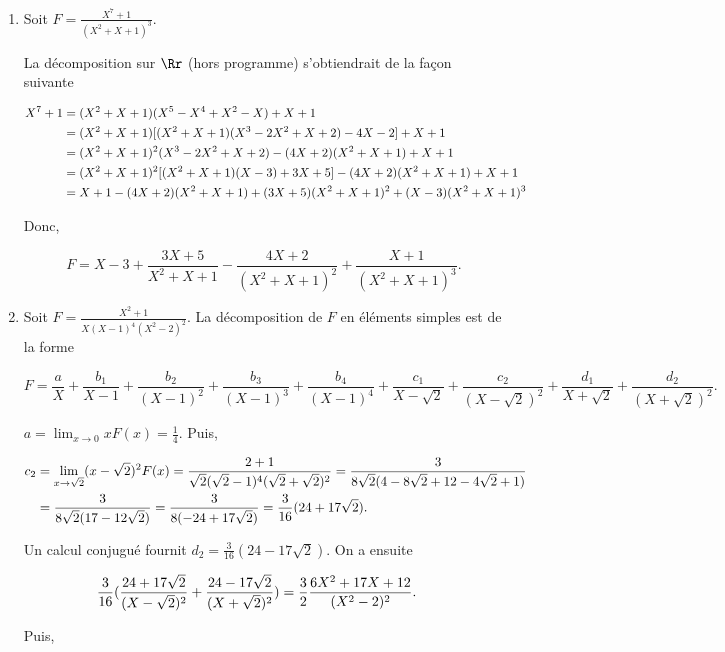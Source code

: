 {{\begin{enumerate}
$$F=X+1+\frac{2}{3}\frac{1}{X-1}-\frac{1}{3}\frac{1}{X-j}-\frac{1}{3}\frac{1}{X-j^2}+\frac{1}{2j+1}\frac{1}{X+j}+\frac{1}{2j^2+1}\frac{1}{X-j^2}.$$

\item  Soit $F=\frac{X^7+1}{(X^2+X+1)^3}$.

La décomposition sur $\Rr$ (hors programme) s'obtiendrait de la façon suivante

\begin{align*}\ensuremath
X^7+1&=(X^2+X+1)(X^5-X^4+X^2-X)+X+1\\
 &=(X^2+X+1)[(X^2+X+1)(X^3-2X^2+X+2)-4X-2]+X+1\\
 &=(X^2+X+1)^2(X^3-2X^2+X+2)-(4X+2)(X^2+X+1)+X+1\\
 &=(X^2+X+1)^2[(X^2+X+1)(X-3)+3X+5]-(4X+2)(X^2+X+1)+X+1\\
 &=X+1-(4X+2)(X^2+X+1)+(3X+5)(X^2+X+1)^2+(X-3)(X^2+X+1)^3
\end{align*}

Donc,

$$F=X-3+\frac{3X+5}{X^2+X+1}-\frac{4X+2}{(X^2+X+1)^2}+\frac{X+1}{(X^2+X+1)^3}.$$

\item  Soit $F=\frac{X^2+1}{X(X-1)^4(X^2-2)^2}$. La décomposition de $F$ en éléments simples est de la forme

$$F=\frac{a}{X}+\frac{b_1}{X-1}+\frac{b_2}{(X-1)^2}+\frac{b_3}{(X-1)^3}+\frac{b_4}{(X-1)^4}+\frac{c_1}{X-\sqrt{2}}+\frac{c_2}{(X-\sqrt{2})^2}+\frac{d_1}{X+\sqrt{2}}+\frac{d_2}{(X+\sqrt{2})^2}.$$

$a=\lim_{x\rightarrow 0}xF(x)=\frac{1}{4}$. Puis, 

\begin{align*}\ensuremath
c_2&=\lim_{x \rightarrow \sqrt{2}}(x-\sqrt{2})^2F(x)=\frac{2+1}{\sqrt{2}(\sqrt{2}-1)^4(\sqrt{2}+\sqrt{2})^2}
=\frac{3}{8\sqrt{2}(4-8\sqrt{2}+12-4\sqrt{2}+1)}\\
 &=\frac{3}{8\sqrt{2}(17-12\sqrt{2})}=\frac{3}{8(-24+17\sqrt{2})}=\frac{3}{16}(24+17\sqrt{2}).
\end{align*}

Un calcul conjugué fournit $d_2=\frac{3}{16}(24-17\sqrt{2})$. On a ensuite

\begin{align*}\ensuremath
\frac{3}{16}(\frac{24+17\sqrt{2}}{(X-\sqrt{2})^2}+\frac{24-17\sqrt{2}}{(X+\sqrt{2})^2})&=\frac{3}{2}\frac{6X^2+17X+12}{(X^2-2)^2}.
\end{align*}

Puis,


\end{enumerate}}}

